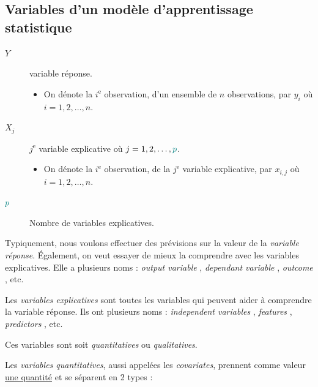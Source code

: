 \documentclass[french]{article}
\begin{document}
\begin{multicols*}{2}
\subsection{Variables d'un modèle d'apprentissage statistique}
\begin{distributions}[Notation]
\begin{description}
	\item[$Y$]	variable réponse.
		\begin{itemize}
		\item	On dénote la $i^{\text{e}}$ observation, d'un ensemble de $n$ observations, par $y_{i}$ où $i = 1, 2, \dots, n$.
		\end{itemize}
	\item[$X_{j}$]	$j^{\text{e}}$ variable explicative où $j = 1, 2, \dots, \textcolor{teal}{p}$.
		\begin{itemize}
		\item	On dénote la $i^{\text{e}}$ observation, de la $j^{\text{e}}$ variable explicative, par $x_{i, j}$ où $i = 1, 2, \dots, n$.
		\end{itemize}
	\item[$\textcolor{teal}{p}$]	Nombre de variables explicatives.
\end{description}
\end{distributions}


\begin{definitionNOHFILL}
Typiquement, nous voulons effectuer des prévisions sur la valeur de la \textit{variable réponse}. Également, on veut essayer de mieux la comprendre avec les variables explicatives. Elle a plusieurs noms : \og \textit{output variable} \fg{}, \og \textit{dependant variable} \fg{}, \og \textit{outcome} \fg{}, etc.
\end{definitionNOHFILL}

\begin{definitionNOHFILL}
Les \textit{variables explicatives} sont toutes les variables qui peuvent aider à comprendre la variable réponse. Ils ont plusieurs noms : \og \textit{independent variables} \fg{}, \og \textit{features} \fg{}, \og \textit{predictors} \fg{}, etc.
\end{definitionNOHFILL}

\bigskip

Ces variables sont soit \textit{quantitatives} ou \textit{qualitatives}.

\begin{definitionNOHFILLsub}
Les \textit{variables quantitatives}, aussi appelées les \og \textit{covariates}, \fg{} prennent comme valeur \underline{une quantité} et se séparent en 2 types : 


\end{definitionNOHFILLsub}
\end{multicols*}
\end{document}
